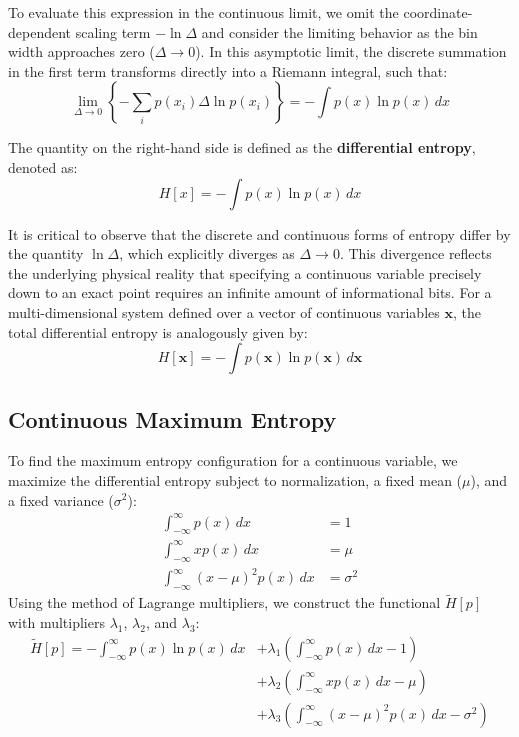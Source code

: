 \documentclass[11pt,a4paper]{article}
\begin{document}
To evaluate this expression in the continuous limit, we omit the coordinate-dependent scaling term $-\ln \Delta$ and consider the limiting behavior as the bin width approaches zero ($\Delta \to 0$). In this asymptotic limit, the discrete summation in the first term transforms directly into a Riemann integral, such that:
\begin{equation}
\lim_{\Delta \to 0} \left\{ -\sum_{i} p(x_i)\Delta \ln p(x_i) \right\} = -\int p(x) \ln p(x) \, dx
\end{equation}

The quantity on the right-hand side is defined as the \textbf{differential entropy}, denoted as:
\begin{equation}
H[x] = -\int p(x) \ln p(x) \, dx
\end{equation}

It is critical to observe that the discrete and continuous forms of entropy differ by the quantity $\ln \Delta$, which explicitly diverges as $\Delta \to 0$. This divergence reflects the underlying physical reality that specifying a continuous variable precisely down to an exact point requires an infinite amount of informational bits. For a multi-dimensional system defined over a vector of continuous variables $\mathbf{x}$, the total differential entropy is analogously given by:
\begin{equation}
H[\mathbf{x}] = -\int p(\mathbf{x}) \ln p(\mathbf{x}) \, d\mathbf{x}
\end{equation}
\subsection{Continuous Maximum Entropy}
To find the maximum entropy configuration for a continuous variable, we maximize the differential entropy subject to normalization, a fixed mean ($\mu$), and a fixed variance ($\sigma^2$):
\begin{align}
\int_{-\infty}^{\infty} p(x) \, dx &= 1 \\
\int_{-\infty}^{\infty} x p(x) \, dx &= \mu \\
\int_{-\infty}^{\infty} (x - \mu)^2 p(x) \, dx &= \sigma^2
\end{align}
Using the method of Lagrange multipliers, we construct the functional $\tilde{H}[p]$ with multipliers $\lambda_1$, $\lambda_2$, and $\lambda_3$:
\begin{align}
\tilde{H}[p] = -\int_{-\infty}^{\infty} p(x) \ln p(x) \, dx &+ \lambda_1 \left( \int_{-\infty}^{\infty} p(x) \, dx - 1 \right) \nonumber \\
&+ \lambda_2 \left( \int_{-\infty}^{\infty} x p(x) \, dx - \mu \right) \nonumber \\
&+ \lambda_3 \left( \int_{-\infty}^{\infty} (x - \mu)^2 p(x) \, dx - \sigma^2 \right)
\end{align}
\end{document}
